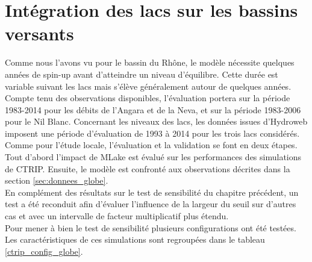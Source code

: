 \section{{\selectfont Intégration des lacs sur les bassins versants}}
\label{sec:eval_globe}

Comme nous l'avons vu pour le bassin du Rhône, le modèle nécessite quelques années de spin-up avant d'atteindre un niveau d'équilibre. Cette durée est variable suivant les lacs mais s'élève généralement autour de quelques années. Compte tenu des observations disponibles, l'évaluation portera sur la période 1983-2014 pour les débits de l'Angara et de la Neva, et sur la période 1983-2006 pour le Nil Blanc. Concernant les niveaux des lacs, les données issues d'Hydroweb imposent une période d'évaluation de 1993 à 2014 pour les trois lacs considérés. \\
Comme pour l'étude locale, l'évaluation et la validation se font en deux étapes. Tout d'abord l'impact de MLake est évalué sur les performances des simulations de CTRIP. Ensuite, le modèle est confronté aux observations décrites dans la section \ref{sec:donnees_globe}.\\

En complément des résultats sur le test de sensibilité du chapitre précédent, un test a été reconduit afin d'évaluer l'influence de la largeur du seuil sur d'autres cas et avec un intervalle de facteur multiplicatif plus étendu.\\
Pour mener à bien le test de sensibilité plusieurs configurations ont été testées. Les caractéristiques de ces simulations sont regroupées dans le tableau \ref{ctrip_config_globe}.

